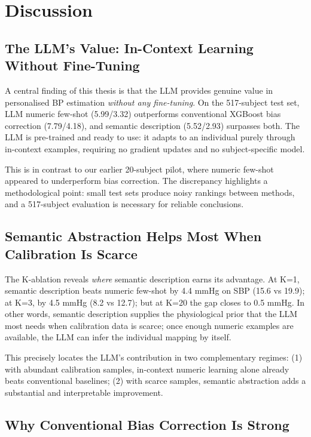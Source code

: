 \chapter{Discussion}
\label{ch:discussion}

\section{The LLM's Value: In-Context Learning Without Fine-Tuning}

A central finding of this thesis is that the LLM provides genuine value in personalised BP estimation \emph{without any fine-tuning}. On the 517-subject test set, LLM numeric few-shot (5.99/3.32) outperforms conventional XGBoost bias correction (7.79/4.18), and semantic description (5.52/2.93) surpasses both. The LLM is pre-trained and ready to use: it adapts to an individual purely through in-context examples, requiring no gradient updates and no subject-specific model.

This is in contrast to our earlier 20-subject pilot, where numeric few-shot appeared to underperform bias correction. The discrepancy highlights a methodological point: small test sets produce noisy rankings between methods, and a 517-subject evaluation is necessary for reliable conclusions.

\section{Semantic Abstraction Helps Most When Calibration Is Scarce}

The K-ablation reveals \emph{where} semantic description earns its advantage. At K=1, semantic description beats numeric few-shot by 4.4 mmHg on SBP (15.6 vs 19.9); at K=3, by 4.5 mmHg (8.2 vs 12.7); but at K=20 the gap closes to 0.5 mmHg. In other words, semantic description supplies the physiological prior that the LLM most needs when calibration data is scarce; once enough numeric examples are available, the LLM can infer the individual mapping by itself.

This precisely locates the LLM's contribution in two complementary regimes: (1) with abundant calibration samples, in-context numeric learning alone already beats conventional baselines; (2) with scarce samples, semantic abstraction adds a substantial and interpretable improvement.

\section{Why Conventional Bias Correction Is Strong}

